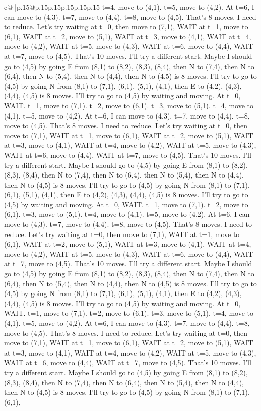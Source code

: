 \documentclass{article}
\begin{document}
{\begin{supertabular}{c@{$\;$}|p{.15\linewidth}@{}p{.15\linewidth}p{.15\linewidth}p{.15\linewidth}p{.15\linewidth}p{.15\linewidth}}
{{{t=4, move to (4,1). t=5, move to (4,2). At t=6, I can move to (4,3). t=7, move to (4,4). t=8, move to (4,5). That's 8 moves. I need to reduce. Let's try waiting at t=0, then move to (7,1), WAIT at t=1, move to (6,1), WAIT at t=2, move to (5,1), WAIT at t=3, move to (4,1), WAIT at t=4, move to (4,2), WAIT at t=5, move to (4,3), WAIT at t=6, move to (4,4), WAIT at t=7, move to (4,5). That's 10 moves. I'll try a different start. Maybe I should go to (4,5) by going E from (8,1) to (8,2), (8,3), (8,4), then N to (7,4), then N to (6,4), then N to (5,4), then N to (4,4), then N to (4,5) is 8 moves. I'll try to go to (4,5) by going N from (8,1) to (7,1), (6,1), (5,1), (4,1), then E to (4,2), (4,3), (4,4), (4,5) is 8 moves. I'll try to go to (4,5) by waiting and moving. At t=0, WAIT. t=1, move to (7,1). t=2, move to (6,1). t=3, move to (5,1). t=4, move to (4,1). t=5, move to (4,2). At t=6, I can move to (4,3). t=7, move to (4,4). t=8, move to (4,5). That's 8 moves. I need to reduce. Let's try waiting at t=0, then move to (7,1), WAIT at t=1, move to (6,1), WAIT at t=2, move to (5,1), WAIT at t=3, move to (4,1), WAIT at t=4, move to (4,2), WAIT at t=5, move to (4,3), WAIT at t=6, move to (4,4), WAIT at t=7, move to (4,5). That's 10 moves. I'll try a different start. Maybe I should go to (4,5) by going E from (8,1) to (8,2), (8,3), (8,4), then N to (7,4), then N to (6,4), then N to (5,4), then N to (4,4), then N to (4,5) is 8 moves. I'll try to go to (4,5) by going N from (8,1) to (7,1), (6,1), (5,1), (4,1), then E to (4,2), (4,3), (4,4), (4,5) is 8 moves. I'll try to go to (4,5) by waiting and moving. At t=0, WAIT. t=1, move to (7,1). t=2, move to (6,1). t=3, move to (5,1). t=4, move to (4,1). t=5, move to (4,2). At t=6, I can move to (4,3). t=7, move to (4,4). t=8, move to (4,5). That's 8 moves. I need to reduce. Let's try waiting at t=0, then move to (7,1), WAIT at t=1, move to (6,1), WAIT at t=2, move to (5,1), WAIT at t=3, move to (4,1), WAIT at t=4, move to (4,2), WAIT at t=5, move to (4,3), WAIT at t=6, move to (4,4), WAIT at t=7, move to (4,5). That's 10 moves. I'll try a different start. Maybe I should go to (4,5) by going E from (8,1) to (8,2), (8,3), (8,4), then N to (7,4), then N to (6,4), then N to (5,4), then N to (4,4), then N to (4,5) is 8 moves. I'll try to go to (4,5) by going N from (8,1) to (7,1), (6,1), (5,1), (4,1), then E to (4,2), (4,3), (4,4), (4,5) is 8 moves. I'll try to go to (4,5) by waiting and moving. At t=0, WAIT. t=1, move to (7,1). t=2, move to (6,1). t=3, move to (5,1). t=4, move to (4,1). t=5, move to (4,2). At t=6, I can move to (4,3). t=7, move to (4,4). t=8, move to (4,5). That's 8 moves. I need to reduce. Let's try waiting at t=0, then move to (7,1), WAIT at t=1, move to (6,1), WAIT at t=2, move to (5,1), WAIT at t=3, move to (4,1), WAIT at t=4, move to (4,2), WAIT at t=5, move to (4,3), WAIT at t=6, move to (4,4), WAIT at t=7, move to (4,5). That's 10 moves. I'll try a different start. Maybe I should go to (4,5) by going E from (8,1) to (8,2), (8,3), (8,4), then N to (7,4), then N to (6,4), then N to (5,4), then N to (4,4), then N to (4,5) is 8 moves. I'll try to go to (4,5) by going N from (8,1) to (7,1), (6,1), }}}
\end{supertabular}}
\end{document}
